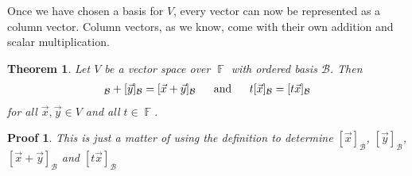 \documentclass[10pt]{article}
\DeclareMathOperator{\F}{{\mathbb{F}}}
\theoremstyle{break}
\newtheorem{thm}{Theorem}[subsection]
\newtheorem*{pf}{Proof}
\begin{document}
Once we have chosen a basis for $V$, every vector can now be represented as a column vector. Column vectors, as we know, come with their own addition and scalar multiplication.
\begin{thm}
    Let $V$ be a vector space over $\F$ with ordered basis $\mathcal{B}$. Then
    \begin{align*}
        [\vec{x}]_{\mathcal{B}} + [\vec{y}]_{\mathcal{B}} = [\vec{x} + \vec{y}]_{\mathcal{B}} \hspace{3ex} \text{ and } \hspace{3ex} t[\vec{x}]_{\mathcal{B}} = [t\vec{x}]_{\mathcal{B}}
    \end{align*}
    for all $\vec{x}, \vec{y} \in V$ and all $t \in \F$.
\end{thm}
\begin{pf}
    This is just a matter of using the definition to determine $[\vec{x}]_{\mathcal{B}}$, $[\vec{y}]_{\mathcal{B}}$, $[\vec{x} + \vec{y}]_{\mathcal{B}}$ and $[t\vec{x}]_\mathcal{B}$
\end{pf}
\end{document}
